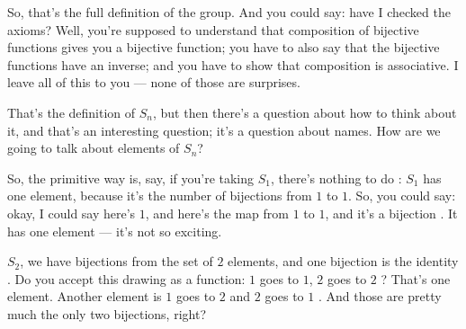 \begin{content}


\end{content}

\begin{speech}[01:03:34 - 01:04:54]
So, that's the full definition of the group. And you could say: have I checked the axioms? Well, you're supposed to understand that composition of bijective functions gives you a bijective function; you have to also say that the bijective functions have an inverse; and you have to show that composition is associative. I leave all of this to you --- none of those are surprises.

That's the definition of $S_n$, but then there's a question about how to think about it, and that's an interesting question; it's a question about names. How are we going to talk about elements of $S_n$?

So, the primitive way is, say, if you're taking $S_1$, there's nothing to do : $S_1$ has one element, because it's the number of bijections from $1$ to $1$. So, you could say: okay, I could say here's $1$, and here's the map from $1$ to $1$, and it's a bijection . It has one element --- it's not so exciting.

$S_2$, we have bijections from the set of $2$ elements, and one bijection is the identity . Do you accept this drawing as a function: $1$ goes to $1$, $2$ goes to $2$ ? That's one element. Another element is $1$ goes to $2$ and $2$ goes to $1$ . And those are pretty much the only two bijections, right?
\end{speech}

